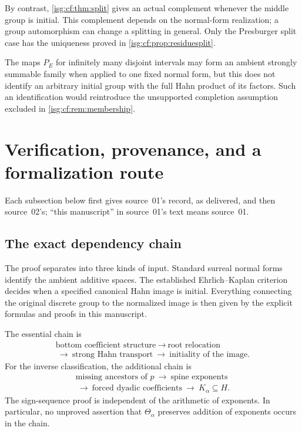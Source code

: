 \documentclass[11pt]{article}
\theoremstyle{definition}
\theoremstyle{remark}
\newcommand{\tht}{\Theta_{\alpha}}
\begin{document}
By contrast, \cref{isg:cf:thm:split} gives an actual complement whenever
the middle group is initial. This complement depends on the normal-form
realization; a group automorphism can change a splitting in general.
Only the Presburger split case has the uniqueness proved in
\cref{isg:cf:prop:residuesplit}.

The maps $P_E$ for infinitely many disjoint intervals may form an
ambient strongly summable family when applied to one fixed normal form,
but this does not identify an arbitrary initial group with the full
Hahn product of its factors. Such an identification would reintroduce
the unsupported completion assumption excluded in
\cref{isg:cf:rem:membership}.

\section{Verification, provenance, and a formalization route}\label{isg:sec:audit}

Each subsection below first gives source~01's record, as delivered, and
then source~02's; ``this manuscript'' in source~01's text means source~01.

\subsection{The exact dependency chain}
The proof separates into three kinds of input. Standard surreal
normal forms identify the ambient additive spaces. The established
Ehrlich--Kaplan criterion decides when a specified canonical Hahn image
is initial. Everything connecting the original discrete group to the
normalized image is then given by the explicit formulas and proofs in
this manuscript.

The essential chain is
\begin{gather*}
 \text{bottom coefficient structure}
 \ \longrightarrow\ \text{root relocation}\\
 \ \longrightarrow\ \text{strong Hahn transport}
 \ \longrightarrow\ \text{initiality of the image}.
\end{gather*}
For the inverse classification, the additional chain is
\begin{gather*}
 \text{missing ancestors of }p
 \ \longrightarrow\ \text{spine exponents}\\
 \ \longrightarrow\ \text{forced dyadic coefficients}
 \ \longrightarrow\ K_\alpha\subseteq H.
\end{gather*}
The sign-sequence proof is independent of the arithmetic of exponents.
In particular, no unproved assertion that $\tht$ preserves addition of
exponents occurs in the chain.
\end{document}

